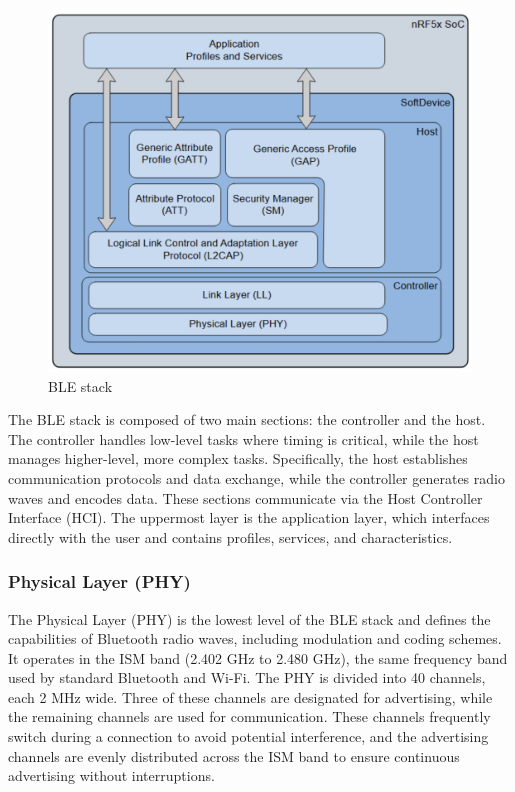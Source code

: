 \documentclass{Configuration_Files/PoliMi3i_thesis}
\begin{document}
\begin{figure}[h]
    \centering
    \includegraphics[width=\linewidth]{Bluetooth Low Energy/Screenshot 2024-08-15 at 23.25.52.png}
    \caption{BLE stack}
    \label{ble_stack}
\end{figure}

The BLE stack is composed of two main sections: the controller and the host. The controller handles low-level tasks where timing is critical, while the host manages higher-level, more complex tasks. Specifically, the host establishes communication protocols and data exchange, while the controller generates radio waves and encodes data. These sections communicate via the Host Controller Interface (HCI). The uppermost layer is the application layer, which interfaces directly with the user and contains profiles, services, and characteristics.

\subsubsection{Physical Layer (PHY)}
The Physical Layer (PHY) is the lowest level of the BLE stack and defines the capabilities of Bluetooth radio waves, including modulation and coding schemes. It operates in the ISM band (2.402 GHz to 2.480 GHz), the same frequency band used by standard Bluetooth and Wi-Fi. The PHY is divided into 40 channels, each 2 MHz wide. Three of these channels are designated for advertising, while the remaining channels are used for communication. These channels frequently switch during a connection to avoid potential interference, and the advertising channels are evenly distributed across the ISM band to ensure continuous advertising without interruptions.
\end{document}

